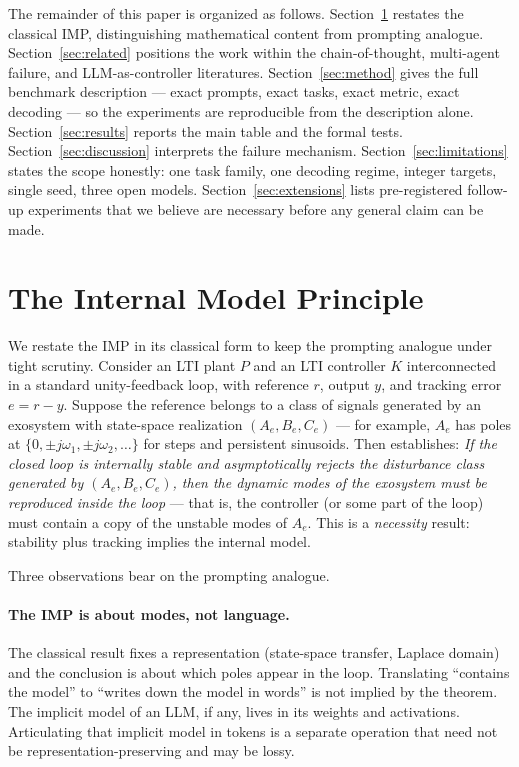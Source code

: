\documentclass[11pt]{article}
\begin{document}
The remainder of this paper is organized as follows.
Section~\ref{sec:imp} restates the classical IMP, distinguishing
mathematical content from prompting analogue.
Section~\ref{sec:related} positions the work within the
chain-of-thought, multi-agent failure, and LLM-as-controller
literatures.  Section~\ref{sec:method} gives the full benchmark
description --- exact prompts, exact tasks, exact metric, exact
decoding --- so the experiments are reproducible from the
description alone.  Section~\ref{sec:results} reports the main
table and the formal tests.  Section~\ref{sec:discussion} interprets
the failure mechanism.  Section~\ref{sec:limitations} states the
scope honestly: one task family, one decoding regime, integer
targets, single seed, three open models.  Section~\ref{sec:extensions}
lists pre-registered follow-up experiments that we believe are
necessary before any general claim can be made.

\section{The Internal Model Principle}
\label{sec:imp}

We restate the IMP in its classical form to keep the prompting
analogue under tight scrutiny.  Consider an LTI plant
\(P\) and an LTI controller \(K\) interconnected in a standard
unity-feedback loop, with reference $r$, output $y$, and tracking
error $e = r - y$.  Suppose the reference belongs to a class of
signals generated by an exosystem with state-space realization
\((A_e, B_e, C_e)\) --- for example, $A_e$ has poles at $\{0,
\pm j\omega_1, \pm j\omega_2, \dots\}$ for steps and persistent
sinusoids.  Then \citep[Theorem 1]{francis1976internal} establishes:
\emph{If the closed loop is internally stable and asymptotically
rejects the disturbance class generated by $(A_e, B_e, C_e)$, then
the dynamic modes of the exosystem must be reproduced inside the
loop} --- that is, the controller (or some part of the loop) must
contain a copy of the unstable modes of $A_e$.  This is a
\emph{necessity} result: stability plus tracking implies the
internal model.

Three observations bear on the prompting analogue.

\paragraph{The IMP is about modes, not language.}  The classical
result fixes a representation (state-space transfer, Laplace
domain) and the conclusion is about which poles appear in the loop.
Translating ``contains the model'' to ``writes down the model in
words'' is not implied by the theorem.  The implicit model of an
LLM, if any, lives in its weights and activations.  Articulating
that implicit model in tokens is a separate operation that need
not be representation-preserving and may be lossy.
\end{document}
